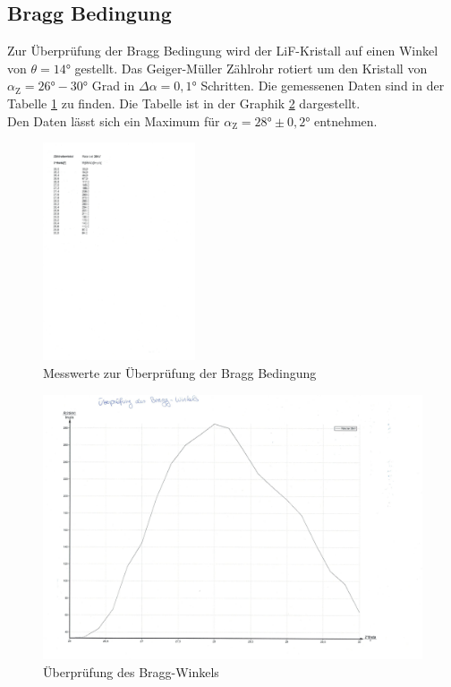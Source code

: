 \subsection{Bragg Bedingung}
Zur Überprüfung der Bragg Bedingung wird der LiF-Kristall auf einen Winkel von $\theta = 14°$ gestellt.
Das Geiger-Müller Zählrohr rotiert um den Kristall von $\alpha_{\text{Z}} = 26° - 30°$ Grad in $\Delta\alpha = 0,1°$ Schritten.
Die gemessenen Daten sind in der Tabelle \ref{tab:bragg} zu finden. Die Tabelle ist in der Graphik \ref{fig:bragg} dargestellt.\\
Den Daten lässt sich ein Maximum für $\alpha_{\text{Z}} = 28°\pm 0,2°$ entnehmen.
\begin{figure}[h!]
  \centering
  \includegraphics[width=0.4\textwidth]{braggtab.pdf}
  \caption{Messwerte zur Überprüfung der Bragg Bedingung}
  \label{tab:bragg}
\end{figure}
\begin{figure}[h!]
  \centering
  \includegraphics[width=\textwidth]{bragggraph.pdf}
  \caption{Überprüfung des Bragg-Winkels}
  \label{fig:bragg}
\end{figure}
\FloatBarrier

